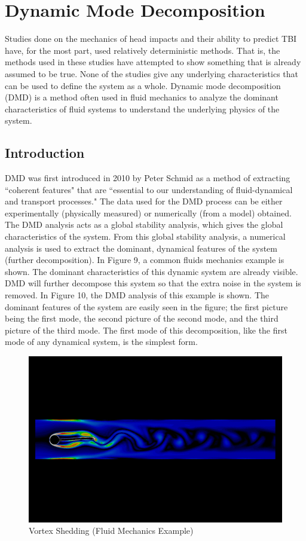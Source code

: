 \documentclass[%
 aip,
 amsmath,amssymb,
 reprint,%
 floatfix,%
]{revtex4-1}
\begin{document}
\section{\label{sec:level4}Dynamic Mode Decomposition}

Studies done on the mechanics of head impacts and their ability to predict TBI have, for the most part, used relatively deterministic methods. That is, the methods used in these studies have attempted to show something that is already assumed to be true. None of the studies give any underlying characteristics that can be used to define the system as a whole. Dynamic mode decomposition (DMD) is a method often used in fluid mechanics to analyze the dominant characteristics of fluid systems to understand the underlying physics of the system.

\subsection{Introduction}

DMD was first introduced in 2010 by Peter Schmid as a method of extracting ``coherent features" that are ``essential to our understanding of fluid-dynamical and transport processes."\cite{Schmid2010} The data used for the DMD process can be either experimentally (physically measured) or numerically (from a model) obtained. The DMD analysis acts as a global stability analysis, which gives the global characteristics of the system. From this global stability analysis, a numerical analysis is used to extract the dominant, dynamical features of the system (further decomposition). In Figure 9, a common fluids mechanics example is shown. The dominant characteristics of this dynamic system are already visible. DMD will further decompose this system so that the extra noise in the system is removed. In Figure 10, the DMD analysis of this example is shown. The dominant features of the system are easily seen in the figure; the first picture being the first mode, the second picture of the second mode, and the third picture of the third mode. The first mode of this decomposition, like the first mode of any dynamical system, is the simplest form. 

\begin{figure}
	\centering
	\includegraphics[scale=0.3]{flow-37.png}
	\caption{Vortex Shedding (Fluid Mechanics Example)}
\end{figure}
\end{document}
